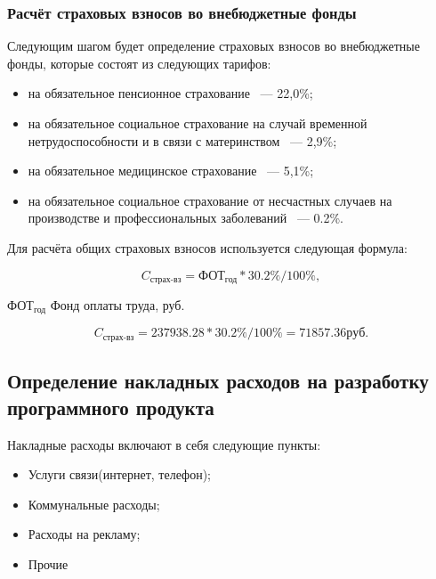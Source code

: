 \subsubsection{Расчёт страховых взносов во внебюджетные фонды}

Следующим шагом будет определение страховых взносов во внебюджетные фонды, которые состоят
из следующих тарифов:

\begin{itemize}
    \item на обязательное пенсионное страхование ~--- 22,0\%;
    \item на обязательное социальное страхование на случай временной нетрудоспособности и в связи с материнством ~--- 2,9\%;
    \item на обязательное медицинское страхование ~--- 5,1\%;
    \item на обязательное социальное страхование от несчастных случаев на производстве и профессиональных заболеваний ~--- 0.2\%.
\end{itemize}

Для расчёта общих страховых взносов используется следующая формула:

\begin{equation}
    C_\text{страх-вз} = \text{ФОТ}_\text{год} * 30.2\% / 100\%,
\end{equation}

\begin{eqexpl}[25mm]
    \item{$\text{ФОТ}_\text{год}$} Фонд оплаты труда, руб.
\end{eqexpl}

\begin{equation*}
    C_\text{страх-вз} = 237938.28 * 30.2\% / 100\% = 71857.36 руб.
\end{equation*}

\subsection{Определение накладных расходов на разработку программного продукта}

Накладные расходы включают в себя следующие пункты:

\begin{itemize}
    \item Услуги связи(интернет, телефон);
    \item Коммунальные расходы;
    \item Расходы на рекламу;
    \item Прочие
\end{itemize}

